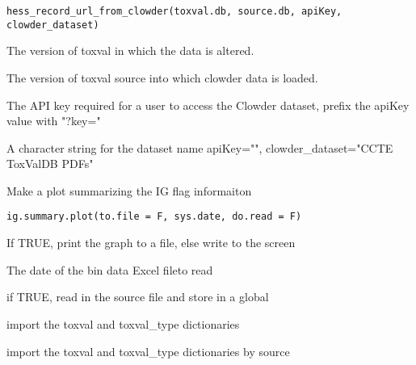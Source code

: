 \documentclass[letterpaper]{book}
\begin{document}
%
\begin{Usage}
\begin{verbatim}
hess_record_url_from_clowder(toxval.db, source.db, apiKey, clowder_dataset)
\end{verbatim}
\end{Usage}
%
\begin{Arguments}
\begin{ldescription}
\item[\code{toxval.db}] The version of toxval in which the data is altered.

\item[\code{source.db}] The version of toxval source into which clowder data is loaded.

\item[\code{apiKey}] The API key required for a user to access the Clowder dataset, prefix the apiKey value with "?key="

\item[\code{clowder\_dataset}] A character string for the dataset name
apiKey="", clowder\_dataset="CCTE ToxValDB PDFs"
\end{ldescription}
\end{Arguments}
%
\begin{Description}\relax
Make a plot summarizing the IG flag informaiton
\end{Description}
%
\begin{Usage}
\begin{verbatim}
ig.summary.plot(to.file = F, sys.date, do.read = F)
\end{verbatim}
\end{Usage}
%
\begin{Arguments}
\begin{ldescription}
\item[\code{to.file}] If TRUE, print the graph to a file, else write to the screen

\item[\code{sys.date}] The date of the bin data Excel fileto read

\item[\code{do.read}] if TRUE, read in the source file and store in a global
\end{ldescription}
\end{Arguments}
%
\begin{Description}\relax
import the toxval and toxval\_type dictionaries

import the toxval and toxval\_type dictionaries by source
\end{Description}
\end{document}
